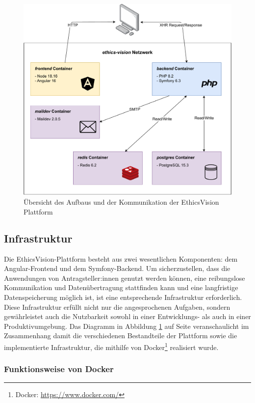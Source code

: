\documentclass[a4paper,12pt,twoside]{scrreprt}
\begin{document}
\begin{figure}[ht]
    \centering
    \includegraphics[width=.84\linewidth]{thesis/images/Luidold_EthicsVision-Diagramm.pdf}
    \caption{Übersicht des Aufbaus und der Kommunikation der EthicsVision Plattform}
    \label{fig:ethics-vision-diagramm}
\end{figure}

\subsection{Infrastruktur}
\label{sub-sec:ausarbeitung-infrastruktur}

Die EthicsVision-Plattform besteht aus zwei wesentlichen Komponenten: dem Angular-Frontend und dem Symfony-Backend.  Um sicherzustellen, dass die Anwendungen von Antragsteller:innen genutzt werden können, eine reibungslose Kommunikation und Datenübertragung stattfinden kann und eine langfristige Datenspeicherung möglich ist, ist eine entsprechende Infrastruktur erforderlich. Diese Infrastruktur erfüllt nicht nur die angesprochenen Aufgaben, sondern gewährleistet auch die Nutzbarkeit sowohl in einer Entwicklungs- als auch in einer Produktivumgebung. Das Diagramm in Abbildung \ref{fig:ethics-vision-diagramm} auf Seite \pageref{fig:ethics-vision-diagramm} veranschaulicht im Zusammenhang damit die verschiedenen Bestandteile der Plattform sowie die implementierte Infrastruktur, die mithilfe von Docker\footnote{Docker: \url{https://www.docker.com/}} realisiert wurde.

\subsubsection*{Funktionsweise von Docker}
\label{funktionsweise-docker}
\end{document}
